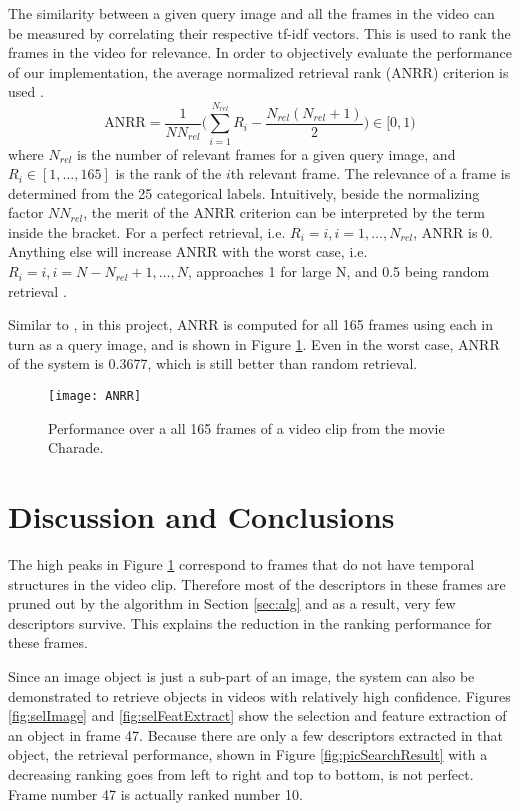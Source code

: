 \documentclass[conference]{IEEEtran}
\begin{document}
The similarity between a given query image and all the frames in the video can be measured by correlating their respective tf-idf vectors. This is used to rank
the frames in the video for relevance. In order to objectively evaluate the performance of our implementation, the average normalized retrieval rank (ANRR) criterion
is used \cite{muller2002truth}.
$$
\text{ANRR} = \frac{1}{NN_{rel}} \big( \sum_{i = 1}^{N_{rel}} R_i - \frac{N_{rel}(N_{rel}+1)}{2} \big) \in [0, 1)
$$
where $N_{rel}$ is the number of relevant frames for a given query image, and $R_{i} \in [1, \dots, 165]$ is the rank of the $i$th relevant frame.
The relevance of a frame is determined from the 25 categorical labels.
Intuitively, beside the normalizing factor $NN_{rel}$, the merit of the ANRR criterion can be interpreted by the term inside the bracket. 
For a perfect retrieval, i.e.
$R_i = i, i = 1, \dots, N_{rel}$, ANRR is 0. Anything else will increase ANRR with the worst case, i.e. $R_i = i, i = N-N_{rel}+1, \dots, N$, 
approaches 1 for large N, and 0.5 being random 
retrieval \cite{muller2002truth}.

Similar to \cite{sivic2003video}, in this project, ANRR is computed for all 165 frames using each in turn  as a query image, and is shown in Figure \ref{fig:anrr}.
Even in the worst case, ANRR of the system is 0.3677, which is still better than random retrieval.

\begin{figure}[!t]
\centering
\texttt{[image: ANRR]}
\caption{Performance over a all 165 frames of a video clip from the movie Charade.}
\label{fig:anrr}
\end{figure}


\section{Discussion and Conclusions}
\label{sec:concl}

The high peaks in Figure \ref{fig:anrr} correspond to frames that do not have temporal structures in the video clip. 
Therefore most of the descriptors in these frames are pruned out by the algorithm in Section \ref{sec:alg} 
and as a result, very few descriptors survive. This explains the reduction in the ranking performance for these frames.


Since an image object is just a sub-part of an image, the system can also be demonstrated to retrieve objects in videos with 
relatively high confidence. Figures \ref{fig:selImage} and \ref{fig:selFeatExtract} show the selection and feature extraction of an object
in frame 47. Because there are only a few descriptors extracted in that object, the retrieval performance, shown in 
Figure \ref{fig:picSearchResult} with a decreasing ranking goes from left to right and top to bottom, 
is not perfect. Frame number 47 is actually ranked number 10.
\end{document}
